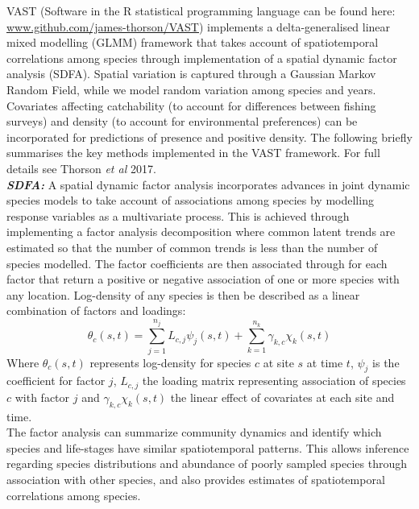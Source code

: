 \documentclass[fleqn,10pt]{wlscirep}
\begin{document}
\begin{linenumbers}
VAST (Software in the R statistical programming language can be found here:
\url{www.github.com/james-thorson/VAST}) implements a delta-generalised linear
mixed modelling (GLMM) framework that takes account of spatiotemporal
correlations among species through implementation of a spatial dynamic factor
analysis (SDFA). Spatial variation is captured through a Gaussian Markov Random
Field, while we model random variation among species and years. Covariates
affecting catchability (to account for differences between fishing surveys) and
density (to account for environmental preferences) can be incorporated for
predictions of presence and positive density. The following briefly summarises
the key methods implemented in the VAST framework. For full details see Thorson
\textit{et al} 2017\cite{Thorson2017}.\\

\textbf{\textit{SDFA:}} A spatial dynamic factor analysis incorporates advances
in joint dynamic species models\cite{Thorson2017} to take account of
associations among species by modelling response variables as a multivariate
process. This is achieved through implementing a factor analysis decomposition
where common latent trends are estimated so that the number of common trends is
less than the number of species modelled. The factor coefficients are then
associated through  for each factor that return a positive or
negative association of one or more species with any location. Log-density of
any species is then be described as a linear combination of factors and
loadings: \begin{equation} \theta_{c}(s,t) = \sum_{j=1}^{n_{j}}
	L_{c,j}\psi_{j}(s,t) +\sum_{k=1}^{n_{k}} \gamma_{k,c}\chi_{k}(s,t)
\end{equation} Where $\theta_{c}(s,t)$ represents log-density for species $c$
at site $s$ at time $t$, $\psi_{j}$ is the coefficient for factor $j$,
$L_{c,j}$ the loading matrix representing association of species $c$ with
factor $j$ and $\gamma_{k,c}\chi_{k}(s,t)$ the linear effect of covariates at
each site and time\cite{Thorson2016b}. \\

The factor analysis can summarize community dynamics and identify which species
and life-stages have similar spatiotemporal patterns. This allows inference
regarding species distributions and abundance of poorly sampled species through
association with other species, and also provides estimates of spatiotemporal
correlations among species\cite{Thorson2016b}.\\


\end{linenumbers}
\end{document}
